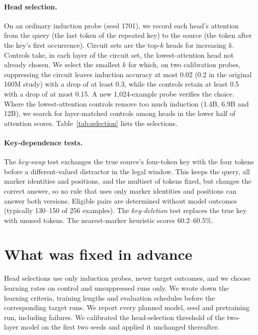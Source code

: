 \paragraph{Head selection.}
On an ordinary induction probe (seed 1701), we record each head's attention from
the query (the last token of the repeated key) to the source (the token after the
key's first occurrence). Circuit sets are the top-$k$ heads for increasing $k$.
Controls take, in each layer of the circuit set, the lowest-attention head not
already chosen. We select the smallest $k$ for which, on two calibration probes,
suppressing the circuit leaves induction accuracy at most 0.02 (0.2 in the
original 160M study) with a drop of at least 0.3, while the controls retain at
least 0.5 with a drop of at most 0.15. A new 1,024-example probe verifies the
choice. Where the lowest-attention controls remove too much induction (1.4B, 6.9B
and 12B), we search for layer-matched controls among heads in the lower half of
attention scores. Table~\ref{tab:selection} lists the selections.

\paragraph{Key-dependence tests.}
The \emph{key-swap} test exchanges the true source's four-token key with the four
tokens before a different-valued distractor in the legal window. This keeps the
query, all marker identities and positions, and the multiset of tokens fixed, but
changes the correct answer, so no rule that uses only marker identities and
positions can answer both versions. Eligible pairs are determined without model
outcomes (typically 130--150 of 256 examples). The \emph{key-deletion} test
replaces the true key with unused tokens. The nearest-marker heuristic scores
60.2--60.5\%.

\section{What was fixed in advance}
\label{app:hygiene}
Head selections use only induction probes, never target outcomes, and we choose
learning rates on control and unsuppressed runs only. We wrote down the learning
criteria, training lengths and evaluation schedules before the corresponding target runs.
We report every planned model, seed and pretraining run, including failures. We
calibrated the head-selection threshold of the two-layer model on the first two
seeds and applied it unchanged thereafter.

